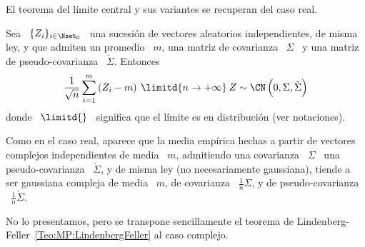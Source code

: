 El teorema del l\'imite central y sus variantes se recuperan del caso real.
%
\begin{teorema}
\label{Teo:MP:CLTComplejo}
%
Sea  \ $\{  Z_i \}_{i  \in  \Nset_0}$ \  una sucesi\'on  de vectores  aleatorios
independientes, de  misma ley, y  que admiten un  promedio \ $m$, una  matriz de
covarianza   \    $\Sigma$   \   y    una   matriz   de    pseudo-covarianza   \
$\check{\Sigma}$. Entonces
  \[
  \frac{1}{\sqrt{n}}  \sum_{i=1}^m  \left( Z_i  -  m  \right)  \: \limitd{n  \to
    +\infty} \: Z \sim \CN\left( 0 , \Sigma , \check{\Sigma} \right)
  \]
  donde  \ $\limitd{}$ \  significa que  el l\'imite  es en  distribuci\'on (ver
  notaciones).
\end{teorema}
%
%
Como en el caso real, aparece que  la media emp\'irica hechas a partir de vectores
complejos independientes de media \  $m$, admitiendo una covarianza \ $\Sigma$ \
una  pseudo-covarianza \  $\check{\Sigma}$, y  de misma  ley  (no necesariamente
gaussiana),  tiende a  ser gaussiana  compleja  de media  \ $m$,  de covarianza  \
$\frac{1}{n} \Sigma$, y de pseudo-covarianza \ $\frac{1}{n} \check{\Sigma}$.

No   lo   presentamos,  pero   se   transpone   sencillamente   el  teorema   de
Lindenberg-Feller~\ref{Teo:MP:LindenbergFeller} al caso complejo.

